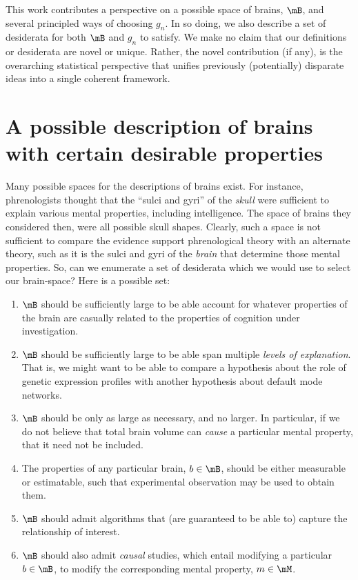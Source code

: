 This work contributes a perspective on a possible space of brains, $\mB$, and several principled ways of choosing $g_n$. In so doing, we also describe a set of desiderata for both $\mB$ and $g_n$ to satisfy. We make no claim that our definitions or desiderata are novel or unique. Rather, the novel contribution (if any), is the overarching statistical perspective that unifies previously (potentially) disparate ideas into a single coherent framework.

\section{A possible description of brains with certain desirable properties} 

\label{sec:B}

Many possible spaces for the descriptions of brains exist. For instance, phrenologists thought that the ``sulci and gyri'' of the \emph{skull} were sufficient to explain various mental properties, including intelligence. The space of brains they considered then, were all possible skull shapes. Clearly, such a space is not sufficient to compare the evidence support phrenological theory with an alternate theory, such as it is the sulci and gyri of the \emph{brain} that determine those mental properties. So, can we enumerate a set of desiderata which we would use to select our brain-space? Here is a possible set:
\begin{enumerate}
	\item $\mB$ should be sufficiently large to be able account for whatever properties of the brain are casually related to the properties of cognition under investigation. 
	\item $\mB$ should be sufficiently large to be able span multiple \emph{levels of explanation}. That is, we might want to be able to compare a hypothesis about the role of genetic expression profiles with another hypothesis about default mode networks. 
	\item $\mB$ should be only as large as necessary, and no larger. In particular, if we do not believe that total brain volume can \emph{cause} a particular mental property, that it need not be included. 
	\item The properties of any particular brain, $b\in \mB$, should be either measurable or estimatable, such that experimental observation may be used to obtain them.	%
	\item $\mB$ should admit algorithms that (are guaranteed to be able to) capture the relationship of interest. 
	\item $\mB$ should also admit \emph{causal} studies, which entail modifying a particular $b \in \mB$, to modify the corresponding mental property, $m \in \mM$. 
\end{enumerate}

